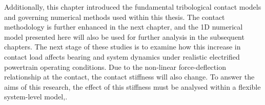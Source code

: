 Additionally, this chapter introduced the fundamental tribological contact models and governing numerical methods used within this thesis. The contact methodology is further enhanced in the next chapter, and the 1D numerical model presented here will also be used for further analysis in the subsequent chapters. The next stage of these studies is to examine how this increase in contact load affects bearing and system dynamics under realistic electrified powertrain operating conditions. Due to the non-linear force-deflection relationship at the contact, the contact stiffness will also change. To answer the aims of this research, the effect of this stiffness must be analysed within a flexible system-level model,.
